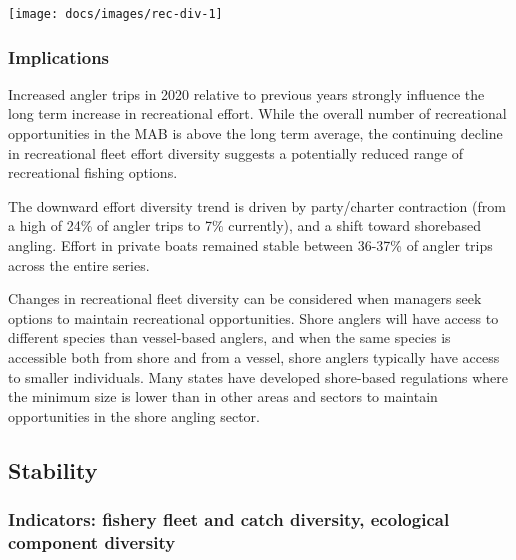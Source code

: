 \documentclass[
  10pt,
]{article}
\let\origfigure\figure
\let\endorigfigure\endfigure
\renewenvironment{figure}[1][2] {
    \expandafter\origfigure\expandafter[H]
} {
    \endorigfigure
}
\begin{document}
\begin{figure}

{\centering \texttt{[image: docs/images/rec-div-1]} 

}

\caption{Recreational fleet effort diversity in the Mid-Atlantic.}\label{fig:rec-div}
\end{figure}

\hypertarget{implications-2}{%
\subsubsection{Implications}\label{implications-2}}

Increased angler trips in 2020 relative to previous years strongly
influence the long term increase in recreational effort. While the
overall number of recreational opportunities in the MAB is above the
long term average, the continuing decline in recreational fleet effort
diversity suggests a potentially reduced range of recreational fishing
options.

The downward effort diversity trend is driven by party/charter
contraction (from a high of 24\% of angler trips to 7\% currently), and
a shift toward shorebased angling. Effort in private boats remained
stable between 36-37\% of angler trips across the entire series.

Changes in recreational fleet diversity can be considered when managers
seek options to maintain recreational opportunities. Shore anglers will
have access to different species than vessel-based anglers, and when the
same species is accessible both from shore and from a vessel, shore
anglers typically have access to smaller individuals. Many states have
developed shore-based regulations where the minimum size is lower than
in other areas and sectors to maintain opportunities in the shore
angling sector.

\hypertarget{stability}{%
\subsection{Stability}\label{stability}}

\hypertarget{indicators-fishery-fleet-and-catch-diversity-ecological-component-diversity}{%
\subsubsection{Indicators: fishery fleet and catch diversity, ecological
component
diversity}\label{indicators-fishery-fleet-and-catch-diversity-ecological-component-diversity}}
\end{document}
